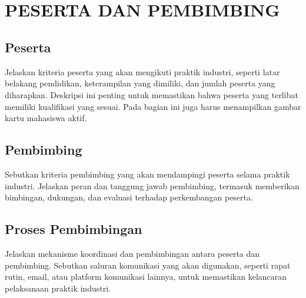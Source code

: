 
\chapter[PESERTA DAN PEMBIMBING]{\\ PESERTA DAN PEMBIMBING}

\section{Peserta}
Jelaskan kriteria peserta yang akan mengikuti praktik industri, seperti latar belakang pendidikan, keterampilan yang dimiliki, dan jumlah peserta yang diharapkan. Deskripsi ini penting untuk memastikan bahwa peserta yang terlibat memiliki kualifikasi yang sesuai. Pada bagian ini juga harus menampilkan gambar kartu mahasiswa aktif.

\section{Pembimbing}
Sebutkan kriteria pembimbing yang akan mendampingi peserta selama praktik industri. Jelaskan peran dan tanggung jawab pembimbing, termasuk memberikan bimbingan, dukungan, dan evaluasi terhadap perkembangan peserta.

\section{Proses Pembimbingan}
Jelaskan mekanisme koordinasi dan pembimbingan antara peserta dan pembimbing. Sebutkan saluran komunikasi yang akan digunakan, seperti rapat rutin, email, atau platform komunikasi lainnya, untuk memastikan kelancaran pelaksanaan praktik industri.